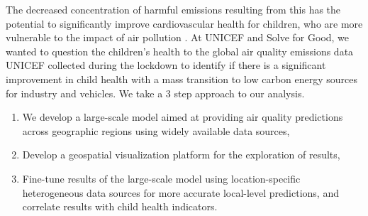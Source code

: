 The decreased concentration of harmful emissions resulting from this has the potential to significantly improve cardiovascular health for children, who are more vulnerable to the impact of air pollution \cite{Rees}. At UNICEF and Solve for Good, we wanted to question the children’s health to the global air quality emissions data UNICEF collected during the lockdown to identify if there is a significant improvement in child health with a mass transition to low carbon energy sources for industry and vehicles.
We take a 3 step approach to our analysis.

\begin{enumerate}
    \item We develop a large-scale model aimed at providing air quality predictions across geographic regions using widely available data sources,
    \item Develop a geospatial visualization platform for the exploration of results,
    \item Fine-tune results of the large-scale model using location-specific heterogeneous data sources for more accurate local-level predictions, and correlate results with child health indicators.
\end{enumerate}

